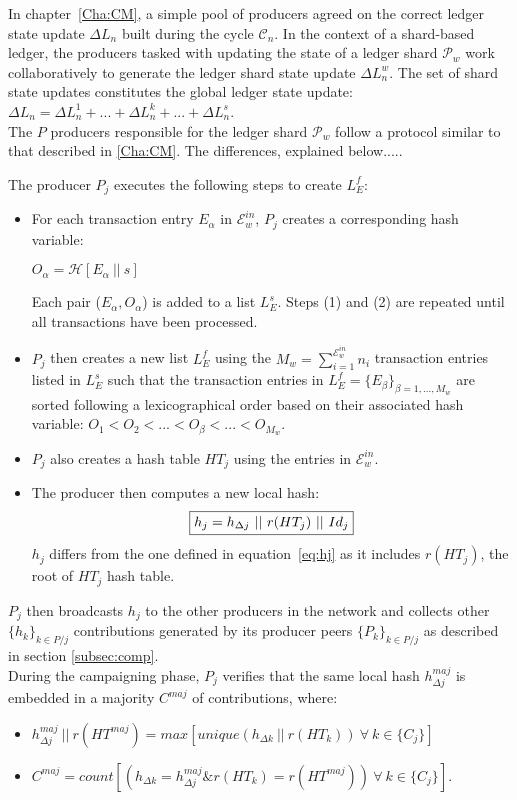 In chapter~\ref{Cha:CM}, a simple pool of producers agreed on the correct ledger state update $\Delta L_n$ built during the cycle $\mathcal{C}_{n}$. In the context of a shard-based ledger, the producers tasked with updating the state of a ledger shard $\mathcal{P}_w$ work collaboratively to generate the ledger shard state update $\Delta L^w_n$. The set of shard state updates constitutes the global ledger state update: $\Delta L_n = \Delta L^1_n + ... + \Delta L^k_n + ...+ \Delta L^s_n$.\\ 

The $P$ producers responsible for the ledger shard $\mathcal{P}_w$ follow a protocol similar to that described in \ref{Cha:CM}. The differences, explained below.....

The producer $P_j$ executes the following steps to create $L_E^f$:
\begin{itemize}
\item For each transaction entry $E_\alpha$ in $\mathcal{E}^{in}_w$, $P_j$ creates a corresponding hash variable: 
\begin{center}
$O_\alpha = \mathcal{H}[E_\alpha~||~s]$
\end{center}
Each pair ($E_\alpha,O_\alpha$) is added to a list $L^s_E$. Steps (1) and (2) are repeated until all transactions have been processed.
\item	$P_j$ then creates a new list $L^f_E$ using the $M_w=\sum_{i=1}^{\mathcal{E}^{in}_w}n_i$ transaction entries listed in $L^s_E$ such that the transaction entries in $L^f_E = \{E_\beta\}_{\beta=1,...,M_w}$ are sorted following a lexicographical order based on their associated hash variable: $O_1 < O_2 < ... < O_\beta < ... < O_{M_w}$. 
\item $P_j$ also creates a hash table $HT_j$ using the entries in $\mathcal{E}^{in}_w$.
\item The producer then computes a new local hash:
\begin{equation}
\label{eq:hj_shard}
\fbox{$h_j = h_{\Delta j}~||~r(HT_j)~||~Id_j$}
\end{equation}
$h_j$ differs from the one defined in equation~\ref{eq:hj} as it includes $r(HT_j)$, the root of $HT_j$ hash table.
\end{itemize}
$P_j$ then broadcasts $h_j$ to the other producers in the network and collects other $\{h_k\}_{k \in P/j}$ contributions generated by its producer peers $\{P_k\}_{k \in P/j}$ as described in section \ref{subsec:comp}.\\

During the campaigning phase, $P_j$ verifies that the same local hash $h^{maj}_{\Delta j}$ is embedded in a majority $C^{maj}$ of contributions, where:
\begin{itemize}
\item $h^{maj}_{\Delta j}~||~r(HT^{maj}) = max[unique(h_{\Delta k}~||~r(HT_k))~\forall~k\in\{C_j\}]$
\item $C^{maj} = count[(h_{\Delta k} = h^{maj}_{\Delta j} \& r(HT_k) = r(HT^{maj}))~\forall~k\in\{C_j\}]$. 
\end{itemize}

